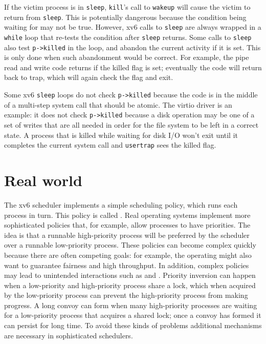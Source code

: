 If the victim process is in
\lstinline{sleep},
\lstinline{kill}'s call to
\lstinline{wakeup}
will cause the victim to return from
\lstinline{sleep}.
This is potentially dangerous because 
the condition being waiting for may not be true.
However, xv6 calls to
\lstinline{sleep}
are always wrapped in a
\lstinline{while}
loop that re-tests the condition after
\lstinline{sleep}
returns.
Some calls to
\lstinline{sleep}
also test
\lstinline{p->killed}
in the loop, and abandon the current activity if it is set.
This is only done when such abandonment would be correct.
For example, the pipe read and write code
returns if the killed flag is set; eventually the
code will return back to trap, which will again
check the flag and exit.

Some xv6 
\lstinline{sleep}
loops do not check
\lstinline{p->killed} 
because the code is in the middle of a multi-step
system call that should be atomic.
The virtio driver
is an example: it does not check
\lstinline{p->killed}
because a disk operation may be one of a set of
writes that are all needed in order for the file system to
be left in a correct state.
A process that is killed while waiting for disk I/O won't
exit until it completes the current system call and
\lstinline{usertrap} sees the killed flag.
\section{Real world}

The xv6 scheduler implements a simple scheduling policy, which runs each process
in turn.  This policy is called
.
Real operating systems implement more sophisticated policies that, for example,
allow processes to have priorities.  The idea is that a runnable high-priority process
will be preferred by the scheduler over a runnable low-priority process.   These
policies can become complex quickly because there are often competing goals: for
example, the operating might also want to guarantee fairness and
high throughput.  In addition, complex policies may lead to unintended
interactions such as
and 
.
Priority inversion can happen when a low-priority and high-priority process
share a lock, which when acquired by the low-priority process can prevent the
high-priority process from making progress.  A long convoy can form when many
high-priority processes are waiting for a low-priority process that acquires a
shared lock; once a convoy has formed it can persist for long time.
To avoid these kinds of problems additional mechanisms are necessary in
sophisticated schedulers.

